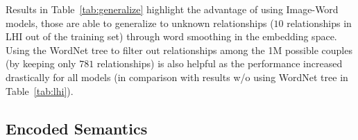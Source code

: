 \begin{table}[t!]
\begin{center}

\caption[WordNet Tree and Unseen relationships]{\textbf{WordNet Tree and Unseen relationships}\label{tab:generalize}
Image-Word Shared models allow to generalize to unseen relationships. Using the
WordNet tree also improves the performance. (IO) refers to the original Image
where an offset was added to filter out relations both in the
WordNet tree and the training set. Part-Object relationships are ranked among $781$ couples.}

\end{center}
\end{table}


Results in Table~\ref{tab:generalize} highlight the advantage of using
Image-Word models, those are able to generalize to unknown relationships ($10$
relationships in LHI out of the training set) through word smoothing in the
embedding space.  Using the WordNet tree to filter out relationships among the
1M possible couples (by keeping only $781$ relationships) is also helpful as
the performance increased drastically for all models (in comparison with
results w/o using WordNet tree in Table~\ref{tab:lhi}).

\subsection{Encoded Semantics}

